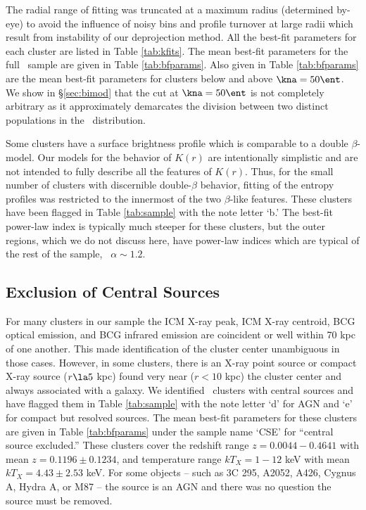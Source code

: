 \documentclass{emulateapj}
\begin{document}
The radial range of fitting was truncated at a maximum radius
(determined by-eye) to avoid the influence of noisy bins and profile
turnover at large radii which result from instability of our
deprojection method. All the best-fit parameters for each cluster are
listed in Table \ref{tab:kfits}. The mean best-fit parameters for the
full \accept\ sample are given in Table \ref{tab:bfparams}. Also given
in Table \ref{tab:bfparams} are the mean best-fit parameters for
clusters below and above $\kna = 50 \ent$. We show in
\S\ref{sec:bimod} that the cut at $\kna=50 \ent$ is not completely
arbitrary as it approximately demarcates the division between two
distinct populations in the \kna\ distribution.

Some clusters have a surface brightness profile which is comparable to
a double $\beta$-model. Our models for the behavior of $K(r)$ are
intentionally simplistic and are not intended to fully describe all
the features of $K(r)$. Thus, for the small number of clusters with
discernible double-$\beta$ behavior, fitting of the entropy profiles
was restricted to the innermost of the two $\beta$-like
features. These clusters have been flagged in Table \ref{tab:sample}
with the note letter `b.' The best-fit power-law index is typically
much steeper for these clusters, but the outer regions, which we do
not discuss here, have power-law indices which are typical of the rest
of the sample, \ie\ $\alpha \sim 1.2$.


\subsection{Exclusion of Central Sources}
\label{sec:centsrc}

For many clusters in our sample the ICM X-ray peak, ICM X-ray
centroid, BCG optical emission, and BCG infrared emission are
coincident or well within 70 kpc of one another. This made
identification of the cluster center unambiguous in those
cases. However, in some clusters, there is an X-ray point source or
compact X-ray source ($r \la 5$ kpc) found very near ($r < 10$ kpc)
the cluster center and always associated with a galaxy. We identified
\centsrcnum\ clusters with central sources and have flagged them in
Table \ref{tab:sample} with the note letter `d' for AGN and `e' for
compact but resolved sources. The mean best-fit parameters for these
clusters are given in Table \ref{tab:bfparams} under the sample name
`CSE' for ``central source excluded.'' These clusters cover the
redshift range $z = 0.0044-0.4641$ with mean $z = 0.1196 \pm 0.1234$,
and temperature range $kT_X = 1-12$ keV with mean $kT_X = 4.43 \pm
2.53$ keV. For some objects -- such as 3C 295, A2052, A426, Cygnus A,
Hydra A, or M87 -- the source is an AGN and there was no question the
source must be removed.
\end{document}
